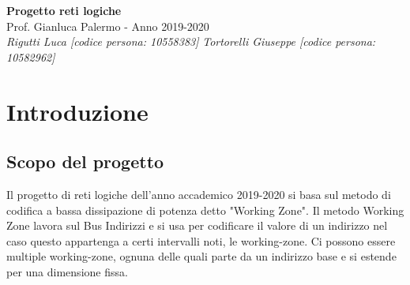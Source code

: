 \documentclass{article}
\begin{document}
\begin{titlepage}
   \begin{center}
      \Huge\textbf{Progetto reti logiche}\\
      \vspace{5mm} %
      \Large Prof. Gianluca Palermo - Anno 2019-2020\\
      \vspace{5mm} %
      \large\textit{Rigutti Luca [codice persona: 10558383]}
      \linebreak
      \large\textit{Tortorelli Giuseppe [codice persona: 10582962]}
   \end{center}
\end{titlepage}


\section{Introduzione}
\subsection{Scopo del progetto}
Il progetto di reti logiche dell'anno accademico 2019-2020 si basa sul metodo di codifica a bassa dissipazione di potenza detto "Working Zone".
Il metodo Working Zone lavora sul Bus Indirizzi e si usa per codificare il valore di un indirizzo nel caso questo appartenga a certi intervalli noti, le working-zone. Ci possono essere multiple working-zone, ognuna delle quali parte da un indirizzo base e si estende per una dimensione fissa.
\end{document}
